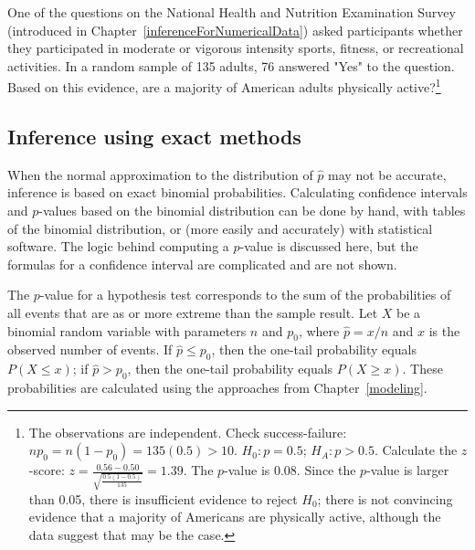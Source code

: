 \begin{exercise} One of the questions on the National Health and Nutrition Examination Survey (introduced in Chapter~\ref{inferenceForNumericalData}) asked participants whether they participated in moderate or vigorous intensity sports, fitness, or recreational activities. In a random sample of 135 adults, 76 answered "Yes" to the question. Based on this evidence, are a majority of American adults physically active?\footnote{The observations are independent. Check success-failure: $np_0 = n(1-p_0) = 135(0.5) > 10$. $H_0: p = 0.5$; $H_A: p > 0.5$. Calculate the $z$-score: $z = \frac{0.56 - 0.50}{\sqrt{\frac{0.5(1-0.5)}{135}}} = 1.39$. The $p$-value is 0.08. Since the $p$-value is larger than 0.05, there is insufficient evidence to reject $H_0$; there is not convincing evidence that a majority of Americans are physically active, although the data suggest that may be the case.}
\end{exercise}


\subsection{Inference using exact methods}

When the normal approximation to the distribution of $\hat{p}$ may not be accurate, inference is based on exact binomial probabilities. Calculating confidence intervals and $p$-values based on the binomial distribution can be done by hand, with tables of the binomial distribution, or (more easily and accurately) with statistical software. The logic behind computing a $p$-value is discussed here, but the formulas for a confidence interval are complicated and are not shown.

The $p$-value for a hypothesis test corresponds to the sum of the probabilities of all events that are as or more extreme than the sample result. Let $X$ be a binomial random variable with parameters $n$ and $p_0$, where $\hat{p} = x/n$ and $x$ is the observed number of events. If $\hat{p} \leq p_0$, then the one-tail probability equals $P(X \leq x)$; if $\hat{p} > p_0$, then the one-tail probability equals $P(X \geq x)$. These probabilities are calculated using the approaches from Chapter~\ref{modeling}.

